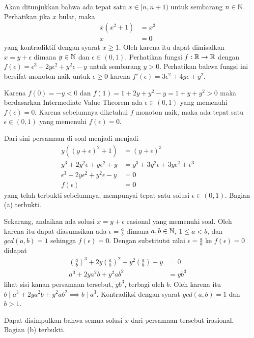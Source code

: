 
\begin{solusi}
    Akan ditunjukkan bahwa ada tepat satu $x \in [n, n+1)$ untuk sembarang $n \in \mathbb N$.
    Perhatikan jika $x$ bulat, maka
    \begin{align*}
        x(x^2+1) &= x^3\\
        x &= 0
    \end{align*}    
    yang kontradiktif dengan syarat $x \ge 1$. Oleh karena itu dapat dimisalkan $x=y+\epsilon$ dimana $y \in \mathbb N$ dan $\epsilon \in (0,1)$. 
    Perhatikan fungsi $f:\mathbb R\to\mathbb R$ dengan $f(\epsilon) = \epsilon^3+2y\epsilon^2+y^2\epsilon-y$ untuk sembarang $y > 0$. Perhatikan bahwa fungsi ini bersifat monoton naik untuk $\epsilon \ge 0$ karena $f'(\epsilon) = 3\epsilon^2+4y\epsilon+y^2$.

    Karena $f(0) = -y < 0$ dan $f(1)=1+2y+y^2-y=1+y+y^2>0$ maka berdasarkan Intermediate Value Theorem ada $\epsilon \in (0,1)$ yang memenuhi $f(\epsilon)=0$. Karena sebelumnya diketahui $f$ monoton naik, maka ada tepat satu $\epsilon \in (0,1)$ yang memenuhi $f(\epsilon)=0$.

    Dari sini persamaan di soal menjadi menjadi
    \begin{align*}
        y((y+\epsilon)^2+1) &= (y+\epsilon)^3\\
        y^3+2y^2\epsilon+y\epsilon^2+y &= y^3+3y^2\epsilon+3y\epsilon^2+\epsilon^3\\
        \epsilon^3+2y\epsilon^2+y^2\epsilon-y &= 0\\
        f(\epsilon) &= 0
    \end{align*}
    yang telah terbukti sebelumnya, mempunyai tepat satu solusi $\epsilon \in (0,1)$. Bagian (a) terbukti.

    Sekarang, andaikan ada solusi $x=y+\epsilon$ rasional yang memenuhi soal. Oleh karena itu dapat diasumsikan ada $\epsilon=\frac{a}{b}$ dimana $a,b \in \mathbb N$, $1 \le a<b$, dan $gcd(a,b)=1$ sehingga $f(\epsilon)=0$. Dengan substitutsi nilai $\epsilon = \frac{a}{b}$ ke $f(\epsilon)=0$ didapat
    \begin{align*}
        \left(\frac{a}{b}\right)^3+2y\left(\frac{a}{b}\right)^2+y^2\left(\frac{a}{b}\right)-y &= 0\\
        a^3+2ya^2b+y^2ab^2 &= yb^3
    \end{align*}
    lihat sisi kanan persamaan tersebut, $yb^3$, terbagi oleh $b$. Oleh karena itu $b \mid a^3+2ya^2b+y^2ab^2 \implies b \mid a^3$. Kontradiksi dengan syarat $gcd(a,b)=1$ dan $b>1$. 

    Dapat disimpulkan bahwa semua solusi $x$ dari persamaan tersebut irasional. Bagian (b) terbukti.
    
\end{solusi}